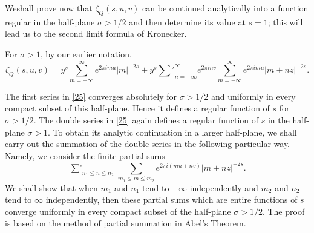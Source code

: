 We\pageoriginale shall prove now that $\zeta_{Q}(s,u,v)$ can be
continued analytically into a function regular in the half-plane
$\sigma>1/2$ and then determine its value at $s=1$; this will lead us
to the second limit formula of Kronecker.

For $\sigma>1$, by our earlier notation,
\begin{equation*}
\zeta_{Q}(s,u,v)=y^{s}\sum^{\infty}_{m=-\infty}e^{2\pi
  imu}|m|^{-2s} + y^{s}{\sum'}^{\infty}_{n=-\infty}e^{2\pi
  inv}\sum^{\infty}_{m=-\infty}e^{2\pi imu}|m+nz|^{-2s}.\tag{25}\label{25}
\end{equation*}

The first series in \eqref{25} converges absolutely for $\sigma>1/2$
and uniformly in every compact subset of this half-plane. Hence it
defines a regular function of $s$ for $\sigma>1/2$. The double series
in \eqref{25} again defines a regular function of $s$ in the
half-plane $\sigma>1$. To obtain its analytic continuation in a larger
half-plane, we shall carry out the summation of the double series in
the following particular way. Namely, we consider the finite partial
sums
$$
\mathop{{\sum}'}_{n_{1}\leq n\leq n_{2}}\sum_{m_{1}\leq m\leq
  m_{2}}e^{2\pi i(mu+nv)}|m+nz|^{-2s}.
$$
We shall show that when $m_{1}$ and $n_{1}$ tend to $-\infty$
independently and $m_{2}$ and $n_{2}$ tend to $\infty$ independently,
then these partial sums which are entire functions of $s$ converge
uniformly in every compact subset of the half-plane $\sigma>1/2$. The
proof is based on the method of partial summation in Abel's Theorem.

